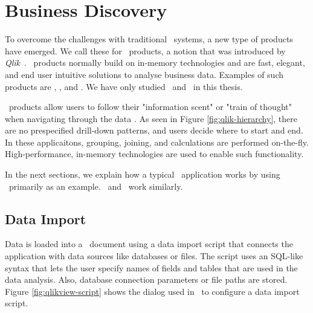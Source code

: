 \section{Business Discovery}
\label{sec:Business Discovery}
To overcome the challenges with traditional \bi~systems, a new type of products have emerged. We call these for \bd~products, a notion that was introduced by \textit{Qlik}~\cite{Qlik2014-vd}. \bd~products normally build on in-memory technologies and are fast, elegant, and end user intuitive solutions to analyse business data. Examples of such products are \powerpivot, \tableau, and \qlikview. We have only studied \qlikview~and \tableau~in this thesis.


\bd~products allow users to follow their "information scent" or "train of thought" when navigating through the data \cite{Kamkolkar2015-iq, Qlik2014-vd}. As seen in Figure \ref{fig:qlik-hierarchy}, there are no prespecified drill-down patterns, and users decide where to start and end. In these applicaitons, grouping, joining, and calculations are performed on-the-fly. High-performance, in-memory technologies are used to enable such functionality. 

In the next sections, we explain how a typical \bd~application works by using \qlikview~primarily as an example. \tableau~and \powerpivot~work similarly.

\subsection{Data Import}
\label{sub:Data Import}


Data is loaded into a \qlikview~document using a data import script that connects the application with data sources like databases or files. The script uses an SQL-like syntax that lets the user specify names of fields and tables that are used in the data analysis. Also, database connection parameters or file paths are stored. Figure \ref{fig:qlikview-script} shows the dialog used in \qlikview~to configure a data import script.

